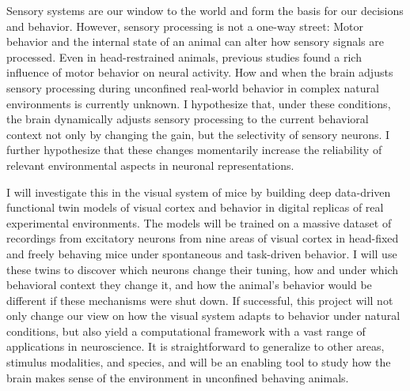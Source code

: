 Sensory systems are our window to the world and form the basis for our decisions and behavior. 
However, sensory processing is not a one-way street:
Motor behavior and the internal state of an animal can alter how sensory signals are processed.
Even in head-restrained animals, previous studies found a rich influence of motor behavior on neural activity. 
How and when the brain adjusts sensory processing during unconfined real-world  behavior in complex natural environments is currently unknown. 
I hypothesize that, under these conditions, the brain dynamically adjusts sensory processing to the current behavioral context not only by changing the gain, but the selectivity of sensory neurons. 
I further hypothesize that these changes momentarily increase the reliability of relevant environmental aspects in neuronal representations. 

I will investigate this in the visual system of mice by building deep data-driven functional twin models of visual cortex and behavior in digital replicas of real experimental environments.
The models will be trained on a massive dataset of recordings from excitatory neurons from nine areas of visual cortex in head-fixed and freely behaving mice under spontaneous and task-driven behavior.
I will use these twins to discover which neurons change their tuning, how and under which behavioral context they change it, and how the animal's behavior would be different if these mechanisms were shut down.
If successful, this project will not only change our view on how the visual system adapts to behavior under natural conditions, but also yield a computational framework with a vast range of applications in neuroscience. 
It is straightforward to generalize to other areas, stimulus modalities, and species, and will be an enabling tool to study how the brain makes sense of the environment in unconfined behaving animals.

